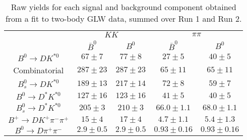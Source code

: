 \begin{table}
  \centering
  \begin{tabular}{ccccc}
      \toprule
       & \multicolumn{2}{c}{$KK$} & \multicolumn{2}{c}{$\pi\pi$} \\
      & $\bar{B}^0$ & $B^0$& $\bar{B}^0$ & $B^0$ \\
      \midrule
      $B^0 \to DK^{*0}$ & $67 \pm 7$ & $77 \pm 8$ & $27 \pm 5$ & $40 \pm 5$ \\
      Combinatorial & $287 \pm 23$ & $287 \pm 23$ & $65 \pm 11$ & $65 \pm 11$ \\
      $B^0_s \to DK^{*0}$ & $189 \pm 13$ & $217 \pm 14$ & $72 \pm 8$ & $59 \pm 7$ \\
      $B^0 \to D^*K^{*0}$ & $127 \pm 16$ & $123 \pm 16$ & $41 \pm 5$ & $40 \pm 5$ \\
      $B^0_s \to D^*K^{*0}$ & $205 \pm 3$ & $210 \pm 3$ & $66.0 \pm 1.1$ & $68.0 \pm 1.1$ \\
      $B^+ \to DK^+\pi^-\pi^+$ & $15 \pm 4$ & $17 \pm 4$ & $4.7 \pm 1.1$ & $5.4 \pm 1.3$ \\
      $B^0 \to D\pi^+\pi^-$ & $2.9 \pm 0.5$ & $2.9 \pm 0.5$ & $0.93 \pm 0.16$ & $0.93 \pm 0.16$ \\
      \bottomrule
      \end{tabular}
\caption{Raw yields for each signal and background component obtained from a fit to two-body GLW data, summed over Run 1 and Run 2.}
\label{tab:yields_split_2body_GLW}
\end{table}
